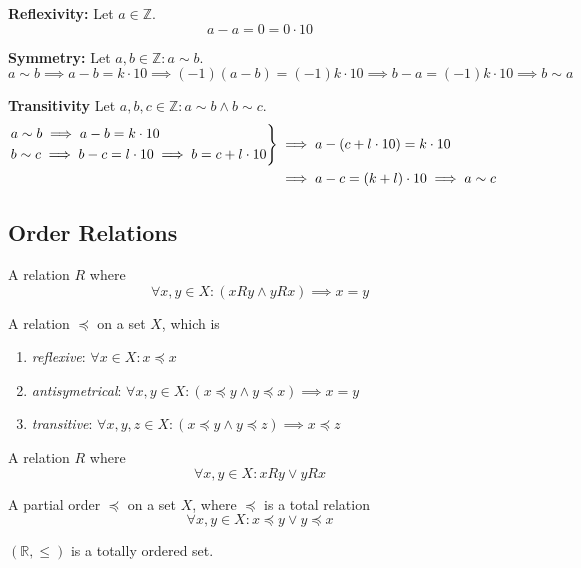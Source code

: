 \textbf{Reflexivity:} Let \(a \in \mathbb{Z}\).
\[a - a = 0 = 0 \cdot 10\]

\textbf{Symmetry:} Let \(a, b \in \mathbb{Z}: a \sim b\).
\[a \sim b \implies a - b = k \cdot 10 \implies (-1)(a - b) = (-1)k \cdot 10 \implies b - a = (-1)k \cdot 10 \implies b \sim a\]

\textbf{Transitivity} Let \(a, b, c \in \mathbb{Z}: a \sim b \land b \sim c\).
\begin{equation*}
   \begin{split}
      \begin{drcases}a \sim b \implies a - b = k \cdot 10\\ b \sim c \implies b - c = l \cdot 10 \implies b = c + l \cdot 10\end{drcases} & \implies a - (c + l \cdot 10) = k \cdot 10\\
      & \implies a - c = (k + l) \cdot 10 \implies a \sim c
   \end{split}
\end{equation*}


\subsection{Order Relations}
\begin{definition}
   A relation \(R\) where
   \[\forall x, y \in X: (xRy \land yRx) \implies x = y\]
\end{definition}

\begin{definition}
   A relation \(\preceq\) on a set \(X\), which is
   \begin{enumerate}[label=\roman*, align=Center]
      \item \textit{reflexive}: \(\forall x \in X: x \preceq x\)
      \item \textit{antisymetrical}: \(\forall x, y \in X: (x \preceq y \land y \preceq x) \implies x = y\)
      \item \textit{transitive}: \(\forall x, y, z \in X: (x \preceq y \land y \preceq z) \implies x \preceq z\)
   \end{enumerate}
\end{definition}

\begin{definition}
   A relation \(R\) where
   \[\forall x, y \in X: xRy \lor yRx\]
\end{definition}

\begin{definition}
   A partial order \(\preceq\) on a set \(X\), where \(\preceq\) is a total relation
   \[\forall x, y \in X: x \preceq y \lor y \preceq x\]
\end{definition}
\begin{example}
   \((\mathbb{R}, \leq)\) is a totally ordered set.
\end{example}

